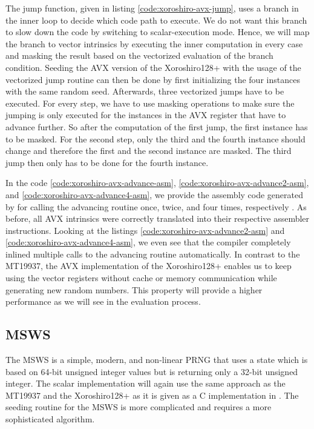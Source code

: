 \documentclass{stdlocal}
\begin{document}
    The jump function, given in listing \ref{code:xoroshiro-avx-jump}, uses a branch in the inner loop to decide which code path to execute.
    We do not want this branch to slow down the code by switching to scalar-execution mode.
    Hence, we will map the branch to vector intrinsics by executing the inner computation in every case and masking the result based on the vectorized evaluation of the branch condition.
    Seeding the AVX version of the Xoroshiro128+ with the usage of the vectorized jump routine can then be done by first initializing the four instances with the same random seed.
    Afterwards, three vectorized jumps have to be executed.
    For every step, we have to use masking operations to make sure the jumping is only executed for the instances in the AVX register that have to advance further.
    So after the computation of the first jump, the first instance has to be masked.
    For the second step, only the third and the fourth instance should change and therefore the first and the second instance are masked.
    The third jump then only has to be done for the fourth instance.

    In the code \ref{code:xoroshiro-avx-advance-asm}, \ref{code:xoroshiro-avx-advance2-asm}, and \ref{code:xoroshiro-avx-advance4-asm}, we provide the assembly code generated by  for calling the advancing routine once, twice, and four times, respectively \autocite{compiler-explorer}.
    As before, all AVX intrinsics were correctly translated into their respective assembler instructions.
    Looking at the listings \ref{code:xoroshiro-avx-advance2-asm} and \ref{code:xoroshiro-avx-advance4-asm}, we even see that the compiler completely inlined multiple calls to the advancing routine automatically.
    In contrast to the MT19937, the AVX implementation of the Xoroshiro128+ enables us to keep using the vector registers without cache or memory communication while generating new random numbers.
    This property will provide a higher performance as we will see in the evaluation process.


  \subsection{MSWS} %
  \label{sub:middle_square_weyl_generator}
    The MSWS is a simple, modern, and non-linear PRNG that uses a state which is based on 64-bit unsigned integer values but is returning only a 32-bit unsigned integer.
    The scalar implementation will again use the same approach as the MT19937 and the Xoroshiro128+ as it is given as a C implementation in \textcite{widynski2019}.
    The seeding routine for the MSWS is more complicated and requires a more sophisticated algorithm.
\end{document}
